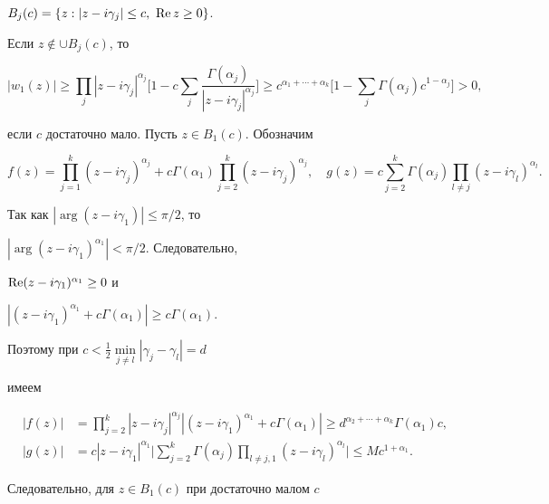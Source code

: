 \begin{pf}
$B_j(c)=\{z:|z-i\gamma_j|\le c,\ \operatorname{Re} z\ge0\}$. 


Если $z\notin\cup B_j(c)$, то 


$$ 


|w_1(z)|\ge\prod_j|z-i\gamma_j|^{\alpha_j}\bigg[1-c\sum_j 


\frac{\Gamma(\alpha_j)}{|z-i\gamma_j|^{\alpha_j}}\bigg]\ge 


c^{\alpha_1+\dotsb+\alpha_k}\bigg[1-\sum_j 


\Gamma(\alpha_j)c^{1-\alpha_j}\bigg]>0, 


$$ 


если $c$ достаточно мало. Пусть $z\in B_1(c)$. Обозначим 


$$ 


f(z)=\prod^k_{j=1}(z-i\gamma_j)^{\alpha_j}+c\Gamma(\alpha_1) 


\prod^k_{j=2}(z-i\gamma_j)^{\alpha_j},\quad 


g(z)=c\sum^k_{j=2}\Gamma(\alpha_j)\prod_{l\ne j} 


(z-i\gamma_l)^{\alpha_l}. 


$$ 


Так как $|\arg(z-i\gamma_1)|\le\pi/2$, то 


$|\arg(z-i\gamma_1)^{\alpha_1}|<\pi/2$. Следовательно, 


$\operatorname{Re}(z-i\gamma_1)^{\alpha_1}\ge 0$ и 


$|(z-i\gamma_1)^{\alpha_1}+c\Gamma(\alpha_1)|\ge c\Gamma(\alpha_1)$. 


Поэтому при $c<\frac{1}{2}\min\limits_{j\ne l}|\gamma_j-\gamma_l|=d$ 


имеем 


\begin{align*} 


|f(z)|&=\prod^k_{j=2}|z-i\gamma_j|^{\alpha_j}|(z-i\gamma_1)^{\alpha_1}+ 


c\Gamma(\alpha_1)|\ge d^{\alpha_2+\dotsb+\alpha_k}\Gamma(\alpha_1)c,\\ 


% 


|g(z)|&=c|z-i\gamma_1|^{\alpha_1}\bigg|\sum^k_{j=2} 


\Gamma(\alpha_j)\prod_{l\ne j,1}(z-i\gamma_l)^{\alpha_l}\bigg|\le 


M c^{1+\alpha_1}. 


\end{align*} 


Следовательно, для $z\in B_1(c)$ при достаточно малом $c$ 


$$ 



\end{pf}
